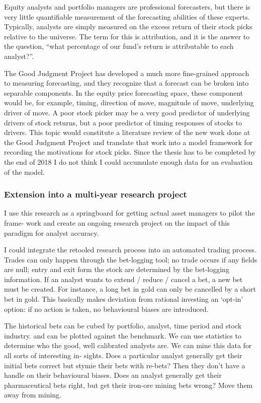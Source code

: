 \documentclass[11pt,preprint, authoryear]{elsarticle}
\numberwithin{equation}{section}
\numberwithin{figure}{section}
\numberwithin{table}{section}
\begin{document}
Equity analysts and portfolio managers are professional forecasters, but
there is very little quantifiable measurement of the forecasting
abilities of these experts. Typically, analysts are simply measured on
the excess return of their stock picks relative to the universe. The
term for this is attribution, and it is the answer to the question,
``what percentage of our fund's return is attributable to each
analyst?''.

The Good Judgment Project has developed a much more fine-grained
approach to measuring forecasting, and they recognize that a forecast
can be broken into separable components. In the equity price forecasting
space, these component would be, for example, timing, direction of move,
magnitude of move, underlying driver of move. A poor stock picker may be
a very good predictor of underlying drivers of stock returns, but a poor
predictor of timing responses of stocks to drivers. This topic would
constitute a literature review of the new work done at the Good Judgment
Project and translate that work into a model framework for recording the
motivations for stock picks. Since the thesis has to be completed by the
end of 2018 I do not think I could accumulate enough data for an
evaluation of the model.

\subsubsection{Extension into a multi-year research
project}\label{extension-into-a-multi-year-research-project}

I use this research as a springboard for getting actual asset managers
to pilot the frame- work and create an ongoing research project on the
impact of this paradigm for analyst accuracy.

I could integrate the retooled research process into an automated
trading process. Trades can only happen through the bet-logging tool; no
trade occurs if any fields are null; entry and exit form the stock are
determined by the bet-logging information. If an analyst wants to extend
/ reduce / cancel a bet, a new bet must be created. For instance, a long
bet in gold can only be cancelled by a short bet in gold. This basically
makes deviation from rational investing an `opt-in' option: if no action
is taken, no behavioural biases are introduced.

The historical bets can be cubed by portfolio, analyst, time period and
stock industry. and can be plotted against the benchmark. We can use
statistics to determine who the good, well calibrated analysts are. We
can mine this data for all sorts of interesting in- sights. Does a
particular analyst generally get their initial bets correct but stymie
their bets with re-bets? Then they don't have a handle on their
behavioural biases. Does an analyst generally get their pharmaceutical
bets right, but get their iron-ore mining bets wrong? Move them away
from mining.
\end{document}
